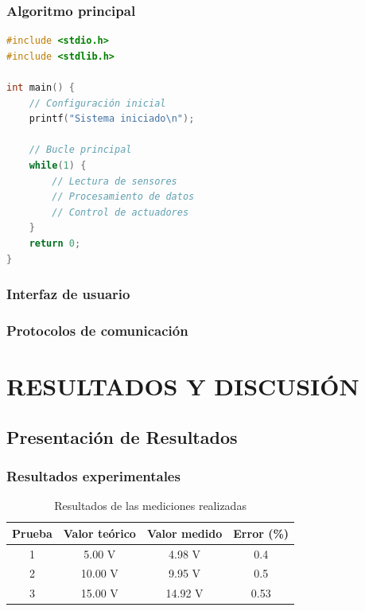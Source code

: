 \documentclass[12pt, letterpaper, oneside]{book}
\begin{document}
\subsection{Algoritmo principal}
\begin{lstlisting}[language=C, caption=Código del sistema]
#include <stdio.h>
#include <stdlib.h>

int main() {
    // Configuración inicial
    printf("Sistema iniciado\n");
    
    // Bucle principal
    while(1) {
        // Lectura de sensores
        // Procesamiento de datos
        // Control de actuadores
    }
    return 0;
}
\end{lstlisting}

\subsection{Interfaz de usuario}
\subsection{Protocolos de comunicación}

\chapter{RESULTADOS Y DISCUSIÓN}

\section{Presentación de Resultados}

\subsection{Resultados experimentales}
\begin{table}[H]
    \centering
    \caption{Resultados de las mediciones realizadas}
    \begin{tabular}{@{}cccc@{}}
        \toprule
        \textbf{Prueba} & \textbf{Valor teórico} & \textbf{Valor medido} & \textbf{Error (\%)} \\
        \midrule
        1 & 5.00 V & 4.98 V & 0.4 \\
        2 & 10.00 V & 9.95 V & 0.5 \\
        3 & 15.00 V & 14.92 V & 0.53 \\
        \bottomrule
    \end{tabular}
    \label{tab:resultados}
\end{table}
\end{document}
